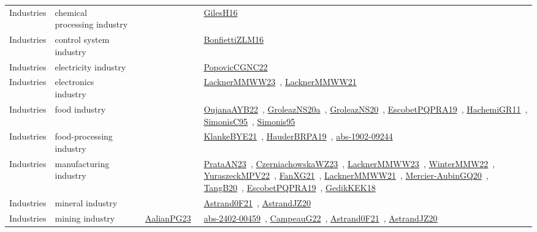 {\begin{longtable}{lp{3cm}>{\raggedright\arraybackslash}p{6cm}>{\raggedright\arraybackslash}p{6cm}>{\raggedright\arraybackslash}p{8cm}}
Industries & chemical processing industry &  &  & \href{papers/GilesH16.pdf}{GilesH16}~\cite{GilesH16}\\
Industries & control system industry &  &  & \href{papers/BonfiettiZLM16.pdf}{BonfiettiZLM16}~\cite{BonfiettiZLM16}\\
Industries & electricity industry &  &  & \href{papers/PopovicCGNC22.pdf}{PopovicCGNC22}~\cite{PopovicCGNC22}\\
Industries & electronics industry &  &  & \href{articles/LacknerMMWW23.pdf}{LacknerMMWW23}~\cite{LacknerMMWW23}, \href{papers/LacknerMMWW21.pdf}{LacknerMMWW21}~\cite{LacknerMMWW21}\\
Industries & food industry &  &  & \href{papers/OujanaAYB22.pdf}{OujanaAYB22}~\cite{OujanaAYB22}, \href{papers/GroleazNS20a.pdf}{GroleazNS20a}~\cite{GroleazNS20a}, \href{papers/GroleazNS20.pdf}{GroleazNS20}~\cite{GroleazNS20}, \href{articles/EscobetPQPRA19.pdf}{EscobetPQPRA19}~\cite{EscobetPQPRA19}, \href{articles/HachemiGR11.pdf}{HachemiGR11}~\cite{HachemiGR11}, \href{papers/SimonisC95.pdf}{SimonisC95}~\cite{SimonisC95}, \href{papers/Simonis95.pdf}{Simonis95}~\cite{Simonis95}\\
Industries & food-processing industry &  &  & \href{papers/KlankeBYE21.pdf}{KlankeBYE21}~\cite{KlankeBYE21}, \href{articles/HauderBRPA19.pdf}{HauderBRPA19}~\cite{HauderBRPA19}, \href{articles/abs-1902-09244.pdf}{abs-1902-09244}~\cite{abs-1902-09244}\\
Industries & manufacturing industry &  &  & \href{articles/PrataAN23.pdf}{PrataAN23}~\cite{PrataAN23}, \href{articles/CzerniachowskaWZ23.pdf}{CzerniachowskaWZ23}~\cite{CzerniachowskaWZ23}, \href{articles/LacknerMMWW23.pdf}{LacknerMMWW23}~\cite{LacknerMMWW23}, \href{papers/WinterMMW22.pdf}{WinterMMW22}~\cite{WinterMMW22}, \href{articles/YuraszeckMPV22.pdf}{YuraszeckMPV22}~\cite{YuraszeckMPV22}, \href{articles/FanXG21.pdf}{FanXG21}~\cite{FanXG21}, \href{papers/LacknerMMWW21.pdf}{LacknerMMWW21}~\cite{LacknerMMWW21}, \href{papers/Mercier-AubinGQ20.pdf}{Mercier-AubinGQ20}~\cite{Mercier-AubinGQ20}, \href{papers/TangB20.pdf}{TangB20}~\cite{TangB20}, \href{articles/EscobetPQPRA19.pdf}{EscobetPQPRA19}~\cite{EscobetPQPRA19}, \href{articles/GedikKEK18.pdf}{GedikKEK18}~\cite{GedikKEK18}\\
Industries & mineral industry &  &  & \href{papers/Astrand0F21.pdf}{Astrand0F21}~\cite{Astrand0F21}, \href{articles/AstrandJZ20.pdf}{AstrandJZ20}~\cite{AstrandJZ20}\\
Industries & mining industry &  & \href{papers/AalianPG23.pdf}{AalianPG23}~\cite{AalianPG23} & \href{articles/abs-2402-00459.pdf}{abs-2402-00459}~\cite{abs-2402-00459}, \href{articles/CampeauG22.pdf}{CampeauG22}~\cite{CampeauG22}, \href{papers/Astrand0F21.pdf}{Astrand0F21}~\cite{Astrand0F21}, \href{articles/AstrandJZ20.pdf}{AstrandJZ20}~\cite{AstrandJZ20}\\

\end{longtable}}
